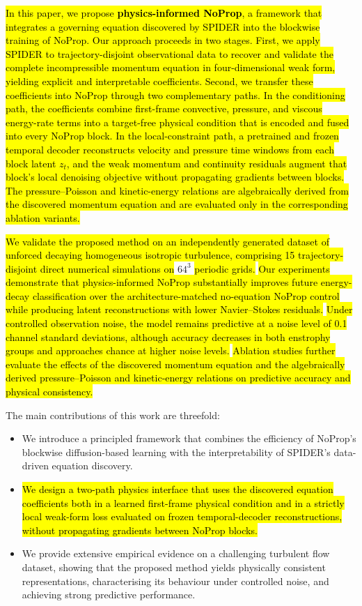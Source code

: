 \documentclass[preprint,12pt]{elsarticle}
\newcommand{\rev}[1]{\hl{#1}}
\begin{document}
\rev{In this paper, we propose \textbf{physics-informed NoProp}, a framework that integrates a governing equation discovered by SPIDER into the blockwise training of NoProp. Our approach proceeds in two stages. First, we apply SPIDER to trajectory-disjoint observational data to recover and validate the complete incompressible momentum equation in four-dimensional weak form, yielding explicit and interpretable coefficients. Second, we transfer these coefficients into NoProp through two complementary paths. In the conditioning path, the coefficients combine first-frame convective, pressure, and viscous energy-rate terms into a target-free physical condition that is encoded and fused into every NoProp block. In the local-constraint path, a pretrained and frozen temporal decoder reconstructs velocity and pressure time windows from each block latent $z_t$, and the weak momentum and continuity residuals augment that block's local denoising objective without propagating gradients between blocks. The pressure--Poisson and kinetic-energy relations are algebraically derived from the discovered momentum equation and are evaluated only in the corresponding ablation variants.}

\rev{We validate the proposed method on an independently generated dataset of unforced decaying homogeneous isotropic turbulence, comprising 15 trajectory-disjoint direct numerical simulations on }$64^3$\rev{ periodic grids.} \rev{Our experiments demonstrate that physics-informed NoProp substantially improves future energy-decay classification over the architecture-matched no-equation NoProp control while producing latent reconstructions with lower Navier--Stokes residuals.} \rev{Under controlled observation noise, the model remains predictive at a noise level of 0.1 channel standard deviations, although accuracy decreases in both enstrophy groups and approaches chance at higher noise levels.} \rev{Ablation studies further evaluate the effects of the discovered momentum equation and the algebraically derived pressure--Poisson and kinetic-energy relations on predictive accuracy and physical consistency.}

The main contributions of this work are threefold:
\begin{itemize}
    \item We introduce a principled framework that combines the efficiency of NoProp's blockwise diffusion-based learning with the interpretability of SPIDER's data-driven equation discovery.
    \item \rev{We design a two-path physics interface that uses the discovered equation coefficients both in a learned first-frame physical condition and in a strictly local weak-form loss evaluated on frozen temporal-decoder reconstructions, without propagating gradients between NoProp blocks.}
    \item We provide extensive empirical evidence on a challenging turbulent flow dataset, showing that the proposed method yields physically consistent representations, characterising its behaviour under controlled noise, and achieving strong predictive performance.
\end{itemize}
\end{document}
